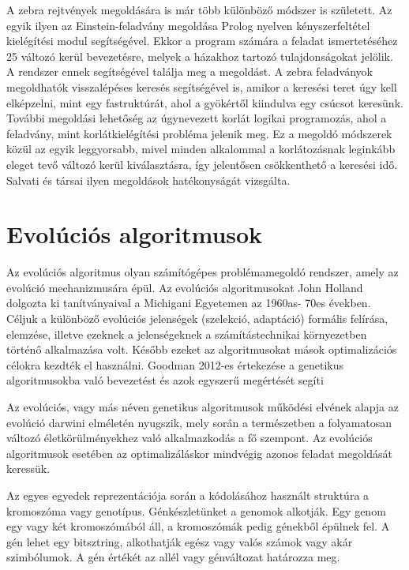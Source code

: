 \documentclass[12pt,a4paper,oneside]{report}
\begin{document}
A zebra rejtvények megoldására is már több különböző módszer is született. 
Az egyik ilyen az Einstein-feladvány megoldása Prolog nyelven kényszerfeltétel kielégítési modul segítségével.
Ekkor a program számára a feladat ismertetéséhez 25 változó kerül bevezetésre, melyek a házakhoz tartozó tulajdonságokat jelölik. 
A rendszer ennek segítségével találja meg a megoldást.
A zebra feladványok megoldhatók visszalépéses keresés segítségével is, amikor a keresési teret úgy kell elképzelni, mint egy fastruktúrát, ahol a gyökértől kiindulva egy csúcsot keresünk.
További megoldási lehetőség az úgynevezett korlát logikai programozás, ahol a feladvány, mint korlátkielégítési probléma jelenik meg. 
Ez a megoldó módszerek közül az egyik leggyorsabb, mivel minden alkalommal a korlátozásnak leginkább eleget tevő változó kerül kiválasztásra, így jelentősen csökkenthető a keresési idő.
Salvati és társai ilyen megoldások hatékonyságát vizsgálta\cite{osszehasonlito}.





\chapter{Evolúciós algoritmusok} %

Az evolúciós algoritmus olyan számítógépes problémamegoldó rendszer, amely az evolúció mechanizmusára épül. 
Az evolúciós algoritmusokat John Holland dolgozta ki tanítványaival a Michigani Egyetemen az 1960as- 70es években. 
Céljuk a különböző evolúciós jelenségek (szelekció, adaptáció) formális felírása, elemzése, illetve ezeknek a jelenségeknek a számítástechnikai környezetben történő alkalmazása volt. 
Később ezeket az algoritmusokat mások optimalizációs célokra kezdték el használni.
Goodman 2012-es értekezése a genetikus algoritmusokba való bevezetést és azok egyszerű megértését segíti\cite{Goodman:2012:IGA:2330784.2330911}

Az evolúciós, vagy más néven genetikus algoritmusok működési elvének alapja az evolúció darwini elméletén nyugszik, mely során a természetben a folyamatosan változó életkörülményekhez való alkalmazkodás a fő szempont. 
Az evolúciós algoritmusok esetében az optimalizáláskor mindvégig azonos feladat megoldását keressük.

Az egyes egyedek reprezentációja során a kódolásához használt struktúra a kromoszóma vagy genotípus. 
Génkészletünket a genomok alkotják. 
Egy genom egy vagy két kromoszómából áll, a kromoszómák pedig génekből épülnek fel. 
A gén lehet egy bitsztring, alkothatják egész vagy valós számok vagy akár szimbólumok. 
A gén értékét az allél vagy génváltozat határozza meg.
\end{document}
